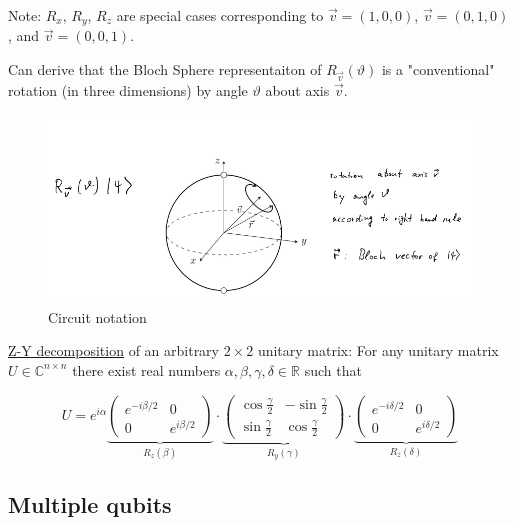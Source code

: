 Note: $R_x$, $R_y$, $R_z$ are special cases corresponding to $\vec{v} = (1, 0, 0)$, 
$\vec{v} = (0, 1, 0)$, and $\vec{v} = (0, 0, 1)$. \newline 

Can derive that the Bloch Sphere representaiton of $R_{\vec{v}}(\vartheta)$ 
is a "conventional" rotation (in three dimensions) by angle $\vartheta$ about 
axis $\vec{v}$.

\begin{figure}[h]
    \centering
    \includegraphics[scale=0.5]{chapters/res/bloch-sphere-rotation.png}
    \caption{Circuit notation}
\end{figure}


\underline{Z-Y decomposition} of an arbitrary $2 \times 2$ unitary matrix: \newline
For any unitary matrix $U \in \mathbb{C}^{n \times n}$ there exist real numbers
$\alpha, \beta, \gamma, \delta \in \mathbb{R}$ such that

\begin{equation}
    U = e^{i \alpha} \underbrace{\begin{pmatrix}
        e^{-i \beta / 2} & 0 \\
        0 & e^{i \beta / 2} 
    \end{pmatrix}}_{R_z(\beta)} \cdot 
    \underbrace{\begin{pmatrix}
        \cos{\frac{\gamma}{2}} & -\sin{\frac{\gamma}{2}} \\
        \sin{\frac{\gamma}{2}} & \cos{\frac{\gamma}{2}}
    \end{pmatrix}}_{R_y(\gamma)} \cdot 
    \underbrace{\begin{pmatrix}
        e^{-i \delta / 2} & 0 \\
        0 & e^{i \delta / 2} 
    \end{pmatrix}}_{R_z(\delta)}
\end{equation}

\subsection{Multiple qubits}